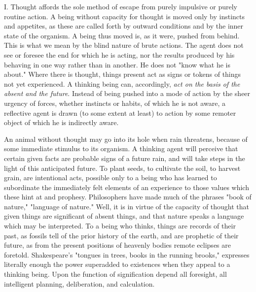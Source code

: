 \documentclass[letterpaper]{book}
\begin{document}
I. Thought affords the sole method of escape from purely impulsive or
purely routine action. A being without capacity for thought is moved
only by instincts and appetites, as these are called forth by outward
conditions and by the inner state of the organism. A being thus moved
is, as it were, pushed from behind. This is what we mean by the blind
nature of brute actions. The agent does not see or foresee the end for
which he is acting, nor the results produced by his behaving in one way
rather than in another. He does not "know what he is about." Where there
is thought, things present act as signs or tokens of things not yet
experienced. A thinking being can, accordingly, \emph{act on the basis
of the absent and the future}. Instead of being pushed into a mode of
action by the sheer urgency of forces,
whether
instincts or habits, of which he is not aware, a reflective agent is
drawn (to some extent at least) to action by some remoter object of
which he is indirectly aware.


An animal without thought may go into its hole when rain threatens,
because of some immediate stimulus to its organism. A thinking agent
will perceive that certain given facts are probable signs of a future
rain, and will take steps in the light of this anticipated future. To
plant seeds, to cultivate the soil, to harvest grain, are intentional
acts, possible only to a being who has learned to subordinate the
immediately felt elements of an experience to those values which these
hint at and prophesy. Philosophers have made much of the phrases "book
of nature," "language of nature." Well, it is in virtue of the capacity
of thought that given things are significant of absent things, and that
nature speaks a language which may be interpreted. To a being who
thinks, things are records of their past, as fossils tell of the prior
history of the earth, and are prophetic of their future, as from the
present positions of heavenly bodies remote eclipses are foretold.
Shakespeare's "tongues in trees, books in the running brooks," expresses
literally enough the power superadded to existences when they appeal to
a thinking being. Upon the function of signification depend all
foresight, all intelligent planning, deliberation, and calculation.

\end{document}
